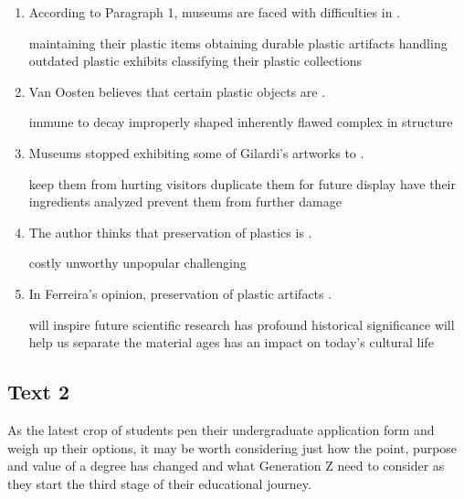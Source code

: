 \begin{enumerate}[resume]
	\item
According to Paragraph 1, museums are faced with difficulties
in \lineread.


\fourchoices
{maintaining their plastic items}
{obtaining durable plastic artifacts}
{handling outdated plastic exhibits}
{classifying their plastic collections}



\item
Van Oosten believes that certain plastic objects are \lineread.


\fourchoices
{immune to decay}
{improperly shaped}
{inherently flawed}
{complex in structure}



\item
 Museums stopped exhibiting some of Gilardi's artworks to
\lineread.


\fourchoices
{keep them from hurting visitors}
{duplicate them for future display}
{have their ingredients analyzed}
{prevent them from further damage}



\item
The author thinks that preservation of plastics is \lineread.


\fourchoices
{costly}
{unworthy}
{unpopular}
{challenging}



\item
In Ferreira's opinion, preservation of plastic artifacts
\lineread.


\fourchoices
{will inspire future scientific research}
{has profound historical significance}
{will help us separate the material ages}
{has an impact on today's cultural life}

\end{enumerate}


\newpage
\subsection{Text 2}

As the latest crop of students pen their undergraduate application form
and weigh up their options, it may be
worth considering just how the point, purpose and value of a degree has
changed and what Generation Z need to
consider as they start the third stage of their educational journey.



